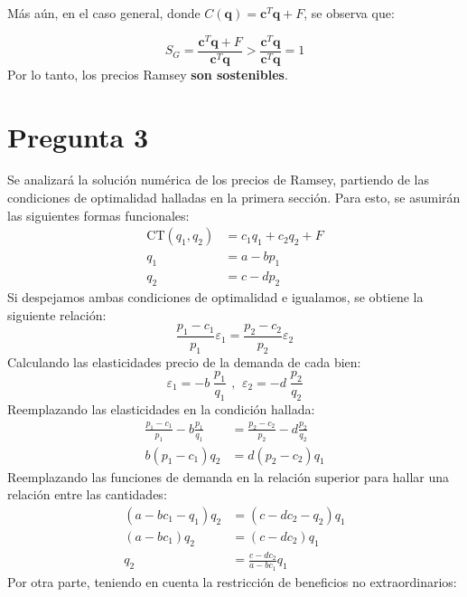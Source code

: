 \documentclass{article}
\begin{document}
Más aún, en el caso general, donde $C(\mathbf{q}) = \mathbf{c}^T\mathbf{q} + F$, se observa que:

\begin{equation*}
    S_G = \frac{\mathbf{c}^T\mathbf{q} + F}{\mathbf{c}^T\mathbf{q}} > \frac{\mathbf{c}^T\mathbf{q}}{\mathbf{c}^T\mathbf{q}} = 1
\end{equation*}
Por lo tanto, los precios Ramsey \textbf{son sostenibles}. 
\newpage

\section*{Pregunta 3}

Se analizará la solución numérica de los precios de Ramsey, partiendo de las condiciones de optimalidad halladas en la primera sección. Para esto, se asumirán las siguientes formas funcionales:
\begin{align*}
    \text{CT}(q_1,q_2) &= c_1q_1 + c_2q_2 + F \\
    q_1 &= a - bp_1\\
    q_2 &= c - dp_2
\end{align*}
Si despejamos ambas condiciones de optimalidad e igualamos, se obtiene la siguiente relación:
\begin{equation}
   \frac{p_1 - c_1}{p_1} \varepsilon_1= \frac{p_2 - c_2}{p_2} \varepsilon_2 \tag{Ramsey} 
\end{equation}
Calculando las elasticidades precio de la demanda de cada bien:
\begin{equation*}
    \varepsilon_1 = -b \; \frac{p_1}{q_1} \ \, , \ \, \varepsilon_2 = -d \; \frac{p_2}{q_2}
\end{equation*}
Reemplazando las elasticidades en la condición hallada:
\begin{align*}
   \frac{p_1 - c_1}{p_1} -b  \frac{p_1}{q_1} &= \frac{p_2 - c_2}{p_2}  -d \frac{p_2}{q_2} \\
   b\left(p_1 - c_1\right)q_2 &= d\left(p_2 - c_2\right)q_1
\end{align*}
Reemplazando las funciones de demanda en la relación superior para hallar una relación entre las cantidades:
\begin{align*}
    (a - bc_1 - q_1)q_2 &= (c - dc_2 - q_2)q_1 \\[4pt]
    (a - bc_1)q_2 &= (c-dc_2)q_1 \\[0pt]
    q_2 &= \frac{c-dc_2}{a - bc_1}q_1 \label{eq1}\tag{1}
\end{align*}
Por otra parte, teniendo en cuenta la restricción de beneficios no extraordinarios:
\end{document}
